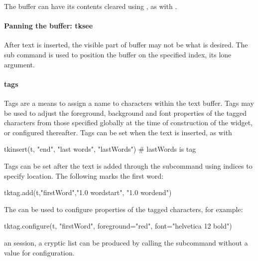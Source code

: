 The buffer can have its contents cleared using , as
with .

\paragraph{Panning the buffer: tksee}
After text is inserted, the visible part of buffer may not be what is
desired. The  sub command is used to position
the buffer on the specified index, its lone argument.


\paragraph{tags}
Tags are a means to assign a name to characters within the text buffer. Tags may be used to adjust the 
foreground, background and font properties of the tagged characters from those specified globally at the time of construction of the widget, or configured thereafter. Tags can be set when the text is inserted, as with
\begin{Schunk}
\begin{Sinput}
 tkinsert(t, "end", "last words", "lastWords") # lastWords is tag
\end{Sinput}
\end{Schunk}

Tags can be set after the text is added through the
 subcommand using indices to specify
location. The following marks the first word:
\begin{Schunk}
\begin{Sinput}
 tktag.add(t,"firstWord","1.0 wordstart", "1.0 wordend")
\end{Sinput}
\end{Schunk}
The  can be used to configure properties of the tagged characters, for example:
\begin{Schunk}
\begin{Sinput}
 tktag.configure(t, "firstWord", foreground="red", 
                 font="helvetica 12 bold")
\end{Sinput}
\end{Schunk}
an \R\/ session, a cryptic list can be produced by calling the
subcommand  without a value for
configuration.


